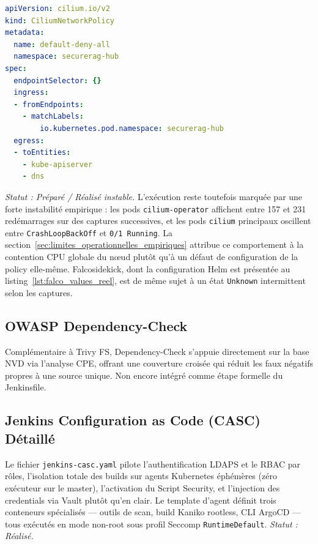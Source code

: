 \begin{lstlisting}[language=yaml, caption={Extrait réel de la politique réseau Zero-Trust Cilium (\texttt{infra/k8s/policies/cilium/default-deny-networkpolicy.yaml})}, label={lst:cilium_default_deny_reel}]
apiVersion: cilium.io/v2
kind: CiliumNetworkPolicy
metadata:
  name: default-deny-all
  namespace: securerag-hub
spec:
  endpointSelector: {}
  ingress:
  - fromEndpoints:
    - matchLabels:
        io.kubernetes.pod.namespace: securerag-hub
  egress:
  - toEntities:
    - kube-apiserver
    - dns
\end{lstlisting}

\textit{Statut : Préparé / Réalisé instable.} L'exécution reste toutefois marquée par une forte instabilité empirique : les pods \texttt{cilium-operator} affichent entre 157 et 231 redémarrages sur des captures successives, et les pods \texttt{cilium} principaux oscillent entre \texttt{CrashLoopBackOff} et \texttt{0/1 Running}. La section~\ref{sec:limites_operationnelles_empiriques} attribue ce comportement à la contention CPU globale du nœud plutôt qu'à un défaut de configuration de la policy elle-même. Falcosidekick, dont la configuration Helm est présentée au listing~\ref{lst:falco_values_reel}, est de même sujet à un état \texttt{Unknown} intermittent selon les captures.

\subsection{OWASP Dependency-Check}
Complémentaire à Trivy FS, Dependency-Check s'appuie directement sur la base NVD via l'analyse CPE, offrant une couverture croisée qui réduit les faux négatifs propres à une source unique. Non encore intégré comme étape formelle du Jenkinsfile.

\subsection{Jenkins Configuration as Code (CASC) Détaillé}
Le fichier \texttt{jenkins-casc.yaml} pilote l'authentification LDAPS et le RBAC par rôles, l'isolation totale des builds sur agents Kubernetes éphémères (zéro exécuteur sur le master), l'activation du Script Security, et l'injection des credentials via Vault plutôt qu'en clair. Le template d'agent définit trois conteneurs spécialisés — outils de scan, build Kaniko rootless, CLI ArgoCD — tous exécutés en mode non-root sous profil Seccomp \texttt{RuntimeDefault}. \textit{Statut : Réalisé.}

